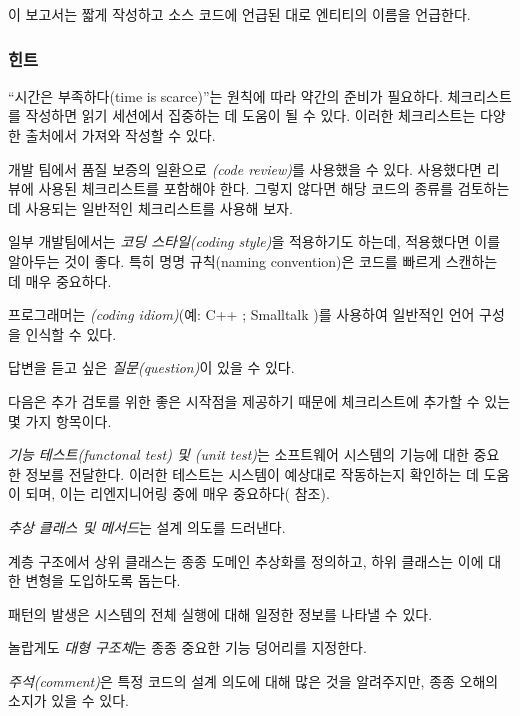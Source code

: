 \documentclass[a4paper,10pt,twoside]{book}
\begin{document}
이 보고서는 짧게 작성하고 소스 코드에 언급된 대로 엔티티의 이름을 언급한다.

\subsubsection*{힌트}

``시간은 부족하다(time is scarce)''는 원칙에 따라 약간의 준비가 필요하다. 체크리스트를 작성하면 읽기 세션에서 집중하는 데 도움이 될 수 있다. 이러한 체크리스트는 다양한 출처에서 가져와 작성할 수 있다.

\begin{bulletlist}
  \item 개발 팀에서 품질 보증의 일환으로 \emph{(code review)}를 사용했을 수 있다. 사용했다면 리뷰에 사용된 체크리스트를 포함해야 한다. 그렇지 않다면 해당 코드의 종류를 검토하는 데 사용되는 일반적인 체크리스트를 사용해 보자.

  \item 일부 개발팀에서는 \emph{코딩 스타일(coding style)}을 적용하기도 하는데, 적용했다면 이를 알아두는 것이 좋다. 특히 명명 규칙(naming convention)은 코드를 빠르게 스캔하는 데 매우 중요하다.

  \item 프로그래머는 \emph{(coding idiom)}(예: C++ \cite{Copl92a} \cite{Meye98a} \cite{Meye96a}; Smalltalk \cite{Beck97a})를 사용하여 일반적인 언어 구성을 인식할 수 있다.

  \item 답변을 듣고 싶은 \emph{질문(question)}이 있을 수 있다.
\end{bulletlist}

다음은 추가 검토를 위한 좋은 시작점을 제공하기 때문에 체크리스트에 추가할 수 있는 몇 가지 항목이다.

\begin{bulletlist}
  \item \emph{기능 테스트(functonal test) 및 (unit test)}는 소프트웨어 시스템의 기능에 대한 중요한 정보를 전달한다. 이러한 테스트는 시스템이 예상대로 작동하는지 확인하는 데 도움이 되며, 이는 리엔지니어링 중에 매우 중요하다( 참조).

  \item \emph{추상 클래스 및 메서드}는 설계 의도를 드러낸다.

  \item 계층 구조에서 상위 클래스는 종종 도메인 추상화를 정의하고, 하위 클래스는 이에 대한 변형을 도입하도록 돕는다.

  \item {} 패턴의 발생은 시스템의 전체 실행에 대해 일정한 정보를 나타낼 수 있다.

  \item 놀랍게도 \emph{대형 구조체}는 종종 중요한 기능 덩어리를 지정한다.

  \item \emph{주석(comment)}은 특정 코드의 설계 의도에 대해 많은 것을 알려주지만, 종종 오해의 소지가 있을 수 있다.

\end{bulletlist}
\end{document}
